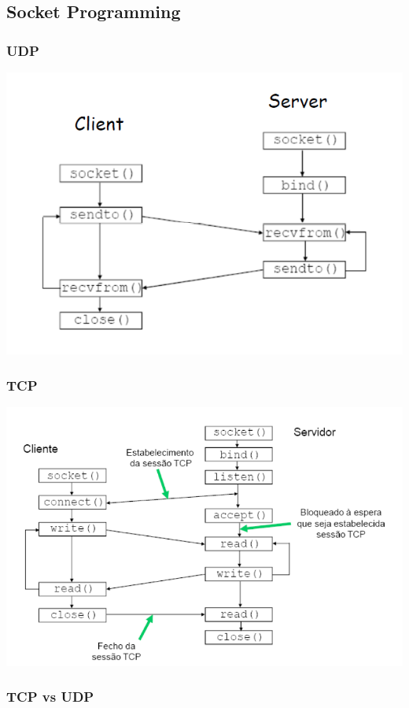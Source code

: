 \documentclass[12pt]{article}
\begin{document}
\subsection{Socket Programming}

\subsubsection*{UDP}

\includegraphics[scale=0.7]{UDP}

\subsubsection*{TCP}

\includegraphics[width=\textwidth]{TCP}

\subsubsection*{TCP vs UDP}
\end{document}

